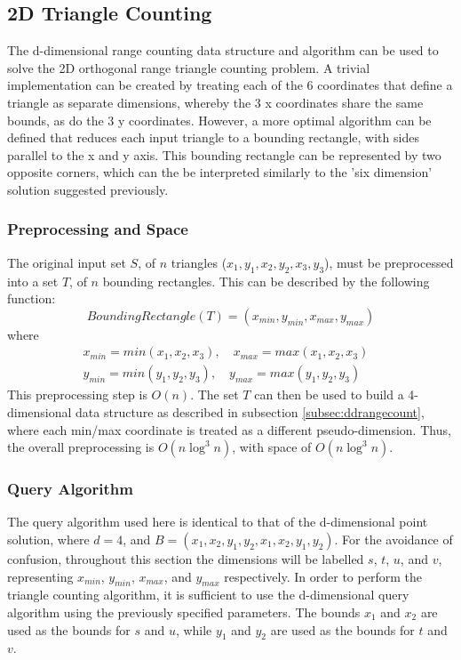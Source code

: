 \documentclass[paper=a4, fontsize=12pt]{article}
\begin{document}
\subsection{2D Triangle Counting}

The d-dimensional range counting data structure and algorithm can be used to solve the 2D orthogonal range triangle counting problem. A trivial implementation can be created by treating each of the 6 coordinates that define a triangle as separate dimensions, whereby the 3 x coordinates share the same bounds, as do the 3 y coordinates. However, a more optimal algorithm can be defined that reduces each input triangle to a bounding rectangle, with sides parallel to the x and y axis. This bounding rectangle can be represented by two opposite corners, which can the be interpreted similarly to the 'six dimension' solution suggested previously.

\subsubsection{Preprocessing and Space}

The original input set \(S\), of \(n\) triangles (\(x_1, y_1, x_2, y_2, x_3, y_3\)), must be preprocessed into a set \(T\), of \(n\) bounding rectangles. This can be described by the following function:
\begin{displaymath}
BoundingRectangle(T) = (x_{min}, y_{min}, x_{max}, y_{max})
\end{displaymath}
where
\begin{align*}
x_{min} = min(x_1, x_2, x_3), \quad x_{max} = max(x_1, x_2, x_3)& \\
y_{min} = min(y_1, y_2, y_3), \quad y_{max} = max(y_1, y_2, y_3)&
\end{align*}
This preprocessing step is \(O(n)\). The set \(T\) can then be used to build a
4-dimensional data structure as described in subsection
\ref{subsec:ddrangecount}, where each min/max coordinate is treated as a
different pseudo-dimension. Thus, the overall preprocessing is \(O(n \log^3 n)\), with
space of \(O(n \log^3 n)\).

\subsubsection{Query Algorithm}

The query algorithm used here is identical to that of the d-dimensional point
solution, where \(d=4\), and \(B = (x_1, x_2, y_1, y_2, x_1, x_2, y_1,
y_2)\). For the avoidance of confusion, throughout this section the dimensions
will be labelled \(s\), \(t\), \(u\), and \(v\), representing \(x_{min}\),
\(y_{min}\), \(x_{max}\), and \(y_{max}\) respectively. In order to perform the
triangle counting algorithm, it is sufficient to use the d-dimensional query
algorithm using the previously specified parameters. The bounds \(x_1\) and
\(x_2\) are used as the bounds for \(s\) and \(u\), while \(y_1\) and \(y_2\)
are used as the bounds for \(t\) and \(v\).
\end{document}
